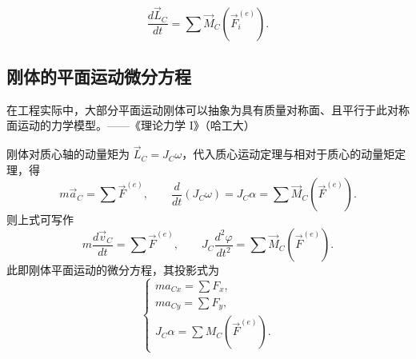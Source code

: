 \begin{theorem}[质点系相对于质心的动量矩定理]
\begin{equation}\label{eq:12-centroid-theorem}
  \frac{d\vec{L}_C}{dt}=\sum\vec{M}_C\left(\vec{F}_i^{(e)}\right).
\end{equation}
\end{theorem}

\subsection{刚体的平面运动微分方程}

在工程实际中，大部分平面运动刚体可以抽象为具有质量对称面、且平行于此对称面运动的力学模型。——《理论力学 I》（哈工大）

刚体对质心轴的动量矩为 $\vec{L}_C=J_C\omega$，代入质心运动定理与相对于质心的动量矩定理，得
\begin{equation}\label{eq:12-planar-vector}
  m\vec{a}_C=\sum\vec{F}^{(e)},
  \qquad
  \frac{d}{dt}(J_C\omega)=J_C\alpha=\sum\vec{M}_C(\vec{F}^{(e)}).
\end{equation}
则上式可写作
\begin{equation}\label{eq:12-planar-eom}
  m\frac{d\vec{v}_C}{dt}=\sum\vec{F}^{(e)},
  \qquad
  J_C\frac{d^2\varphi}{dt^2}=\sum\vec{M}_C(\vec{F}^{(e)}).
\end{equation}
此即刚体平面运动的微分方程，其投影式为
\begin{equation}\label{eq:12-planar-proj}
\begin{cases}
  ma_{Cx}=\sum F_x,\\
  ma_{Cy}=\sum F_y,\\
  J_C\alpha=\sum M_C(\vec{F}^{(e)}).
\end{cases}
\end{equation}
